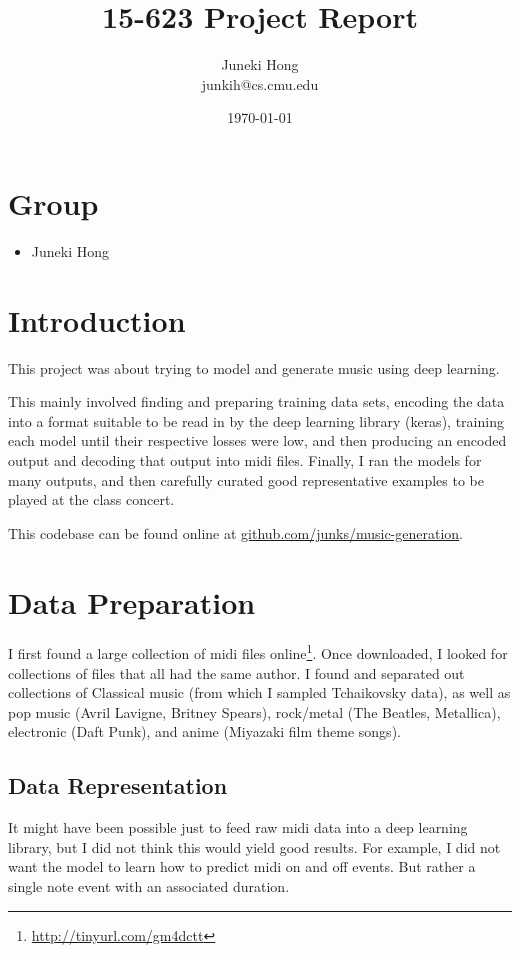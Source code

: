 \documentclass[12pt]{article}
\title{15-623 Project Report}
\author{Juneki Hong \\
  junkih@cs.cmu.edu\\
}
\date{\today}
\begin{document}
\maketitle

\section{Group}
\begin{itemize}
\item Juneki Hong
\end{itemize}

\section{Introduction}
This project was about trying to model and generate music using deep learning.

This mainly involved finding and preparing training data sets, encoding the data into a format suitable to be read in by the deep learning library (keras), training each model until their respective losses were low, and then producing an encoded output and decoding that output into midi files.
Finally, I ran the models for many outputs, and then carefully curated good representative examples to be played at the class concert.

This codebase can be found online at \url{github.com/junks/music-generation}.

\section{Data Preparation}

I first found a large collection of midi files online\footnote{\url{http://tinyurl.com/gm4dctt}}. Once downloaded, I looked for collections of files that all had the same author. I found and separated out collections of Classical music (from which I sampled Tchaikovsky data), as well as pop music (Avril Lavigne, Britney Spears), rock/metal (The Beatles, Metallica), electronic (Daft Punk), and anime (Miyazaki film theme songs).

\subsection{Data Representation}

It might have been possible just to feed raw midi data into a deep learning library, but I did not think this would yield good results. For example, I did not want the model to learn how to predict midi on and off events. But rather a single note event with an associated duration.
\end{document}
